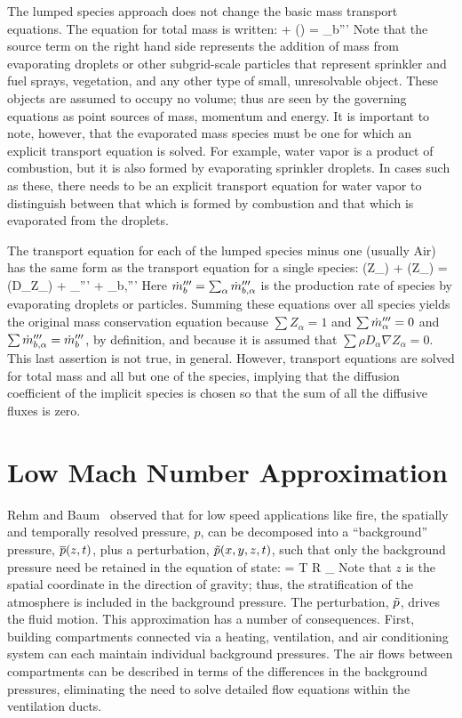 The lumped species approach does not change the basic mass transport equations. The equation for total mass is written:
\be {} + \nabla\!\cdot (\rho \bu)  =  \dm_b'''  \label{mass} \ee
Note that the source term on the right hand side represents the addition of mass from evaporating droplets or other subgrid-scale
particles that represent sprinkler and fuel sprays, vegetation, and any other type of small, unresolvable object. These
objects are assumed to occupy no volume; thus are seen by the governing equations as point sources of mass, momentum and energy. It is important to 
note, however, that the evaporated mass species must be one for which an explicit transport equation is solved. For example, water vapor is a product of
combustion, but it is also formed by evaporating sprinkler droplets. In cases such as these, there needs to be an explicit transport equation for water
vapor to distinguish between that which is formed by combustion and that which is evaporated from the droplets. 

The transport equation for each of the lumped species minus one (usually Air) has the same form as the transport equation for a single species: 
\be {}(\rho Z_\alpha) + \nabla\!\cdot (\rho Z_\alpha \bu) = \nabla\!\cdot (\rho D_\alpha \nabla Z_\alpha) + \dm_\alpha''' + \dm_{b,\alpha}''' \label{species} \ee
Here $\dot{m}_b'''=\sum_\alpha \dot{m}_{b,\alpha}'''$ is the production rate of species by evaporating droplets or particles.
Summing these equations over all species yields the original mass conservation equation because
$\sum Z_\alpha=1$ and $\sum \dot{m}_\alpha''' = 0$ and $\sum \dot{m}_{b,\alpha}'''=\dot{m}_b'''$, by definition, and because it is assumed
that $\sum \rho D_\alpha \nabla Z_\alpha = 0$. This last assertion is not true, in general.
However, transport equations are solved for total
mass and all but one of the species, implying that the diffusion coefficient of the implicit species is
chosen so that the sum of all the diffusive fluxes is zero.

\section{Low Mach Number Approximation}

Rehm and Baum~\cite{Rehm:1} observed that for low speed applications like fire, the
spatially and temporally resolved pressure, $p$, can be decomposed into a ``background'' pressure,
$\overline{p}(z,t)$, plus a perturbation, $\tilde{p}(x,y,z,t)$, such that only the background pressure need be retained in the
equation of state:
\be \bp = \rho T {\cal R} \sum_\alpha  {} \equiv {}  \label{basicstate1} \ee
Note that $z$ is the spatial coordinate in the direction of gravity; thus, the stratification of the atmosphere is included in
the background pressure. The perturbation, $\tilde{p}$, drives the fluid motion.
This approximation has a number of consequences. First, building compartments connected via a heating, ventilation, and air
conditioning system can each maintain individual background pressures. The air flows between compartments can be
described in terms of the differences in the background pressures, eliminating the need to solve detailed flow
equations within the ventilation ducts.

